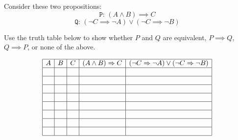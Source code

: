 \documentclass[12pt,oneside]{article}
\begin{document}
\begin{problem}{10}

Consider these two propositions:
$$\texttt{P: } (A \wedge B) \implies C$$
$$\texttt{Q: } (\neg C \implies \neg A) \vee (\neg C \implies \neg B)$$ 

Use the truth table below to show whether $P$ and $Q$ are equivalent, $P \implies Q$, $Q \implies P$, or none of the above.

%
\[
\begin{array}{|c|c|c|c|c|}
\hline
A & B & C & (A \wedge B) \implies C & (\neg C \implies \neg A) \vee (\neg C \implies \neg B) \\ \hline
& & & & \\ \hline
& & & & \\ \hline
& & & & \\ \hline
& & & & \\ \hline
& & & & \\ \hline
& & & & \\ \hline
& & & & \\ \hline
& & & & \\ \hline
\end{array}
\]
%

%

\end{problem}


\newcommand{\card}[1]{\left|#1\right|}

\end{document}
